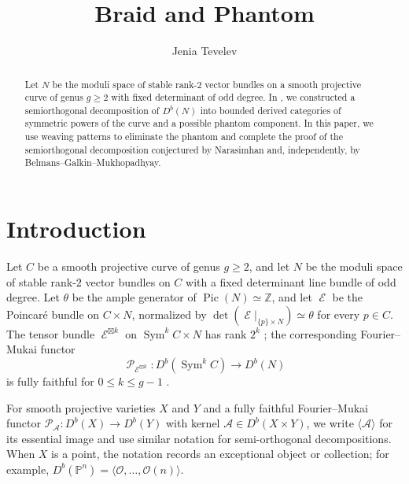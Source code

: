 \documentclass[11pt,letterpaper]{amsart}
\title{Braid and Phantom}
\author{Jenia Tevelev}
\theoremstyle{plain}
\theoremstyle{definition}
\theoremstyle{remark}
\numberwithin{equation}{section}
\DeclareMathOperator{\Pic}{Pic}
\DeclareMathOperator{\Sym}{Sym}
\DeclareMathOperator{\cE}{\mathcal{E}}
\DeclareMathOperator{\cP}{\mathcal{P}}
\begin{document}
\begin{abstract}
Let $N$ be the moduli space of stable rank-$2$ vector bundles on a smooth
projective curve of genus $g\ge2$ with fixed determinant of odd degree. In
\cite{TT}, we constructed a semiorthogonal decomposition of $D^b(N)$ into
bounded derived categories of symmetric powers of the curve and a possible
phantom component. In this paper, we use weaving patterns to eliminate the
phantom and complete the proof of the semiorthogonal decomposition conjectured by
Narasimhan and, independently, by Belmans--Galkin--Mukhopadhyay.
 \end{abstract}


\maketitle



\section{Introduction}

Let $C$ be a smooth projective curve of genus $g\ge2$, and let $N$ be the
moduli space of stable rank-$2$ vector bundles on $C$ with a fixed
determinant line bundle of odd degree.  Let $\theta$ be the ample generator
of $\Pic(N)\simeq\mathbb Z$, and let $\cE$ be the Poincar\'e bundle on
$C\times N$, normalized by
$\det(\cE|_{\{p\}\times N})\simeq\theta$ for every $p\in C$.
The tensor bundle $\cE^{\boxtimes k}$ on $\Sym^kC\times N$ has
rank $2^k$ \cite[Definition~2.3]{TT}; the corresponding
Fourier--Mukai functor
\[
 \cP_{\cE^{\boxtimes k}}:D^b(\Sym^kC)\longrightarrow D^b(N)
\]
is fully faithful for $0\le k\le g-1$ \cite[Theorem~1.1]{TT}.



For smooth projective varieties $X$ and $Y$ and a fully faithful
Fourier--Mukai functor
$
 \mathcal P_{\mathcal A}:D^b(X)\longrightarrow D^b(Y)$ with kernel
$\mathcal A\in D^b(X\times Y)$,
we write $\langle\mathcal A\rangle$ for its  essential image and use similar notation for semi-orthogonal decompositions.
When $X$ is a point, the notation records an exceptional object or collection;
for example, $D^b(\mathbb P^n)=\langle\mathcal O,\ldots,\mathcal O(n)\rangle$.
 
\end{document}
